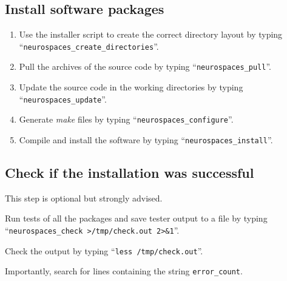 \documentclass[12pt]{article}
\begin{document}
\subsection*{Install software packages}

\begin{enumerate}
   \item Use the installer script to create the correct directory layout by typing ``{\tt neurospaces\_create\_directories}''.
   \item Pull the archives of the source code by typing ``{\tt neurospaces\_pull}''.
   \item Update the source code in the working directories by typing ``{\tt neurospaces\_update}''.
   \item Generate {\it make} files by typing ``{\tt neurospaces\_configure}''.
   \item Compile and install the software by typing ``{\tt neurospaces\_install}''.
\end{enumerate}

\subsection*{Check if the installation was successful}

This step is optional but strongly advised.

\begin{description}      
   \item Run tests of all the packages and save tester output to a file  by typing ``{\tt neurospaces\_check >/tmp/check.out 2>\&1}''.
   \item Check the output by typing ``{\tt less /tmp/check.out}''.
\end{description}
Importantly, search for lines containing the string {\tt error\_count}.    


%
%
%
%
\end{document}
